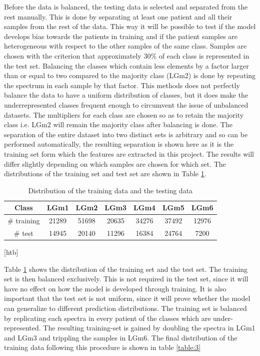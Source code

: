 Before the data is balanced, the testing data is selected and separated from the rest manually. This is done by separating at least one patient and all their samples from the rest of the data. This way it will be possible to test if the model develops bias towards the patients in training and if the patient samples are heterogeneous with respect to the other samples of the same class. Samples are chosen with the criterion that approximately $30\%$ of each class is represented in the test set. Balancing the classes which contain less elements by a factor larger than or equal to two compared to the majority class (LGm2) is done by repeating the spectrum in each sample by that factor. This methods does not perfectly balance the data to have a uniform distribution of classes, but it does make the underrepresented classes frequent enough to circumvent the issue of unbalanced datasets. The multipliers for each class are chosen so as to retain the majority class i.e. LGm2 will remain the majority class after balancing is done. The separation of the entire dataset into two distinct sets is arbitrary and so can be performed automatically, the resulting separation is shown here as it is the training set form which the features are extracted in this project. The results will differ slightly depending on which samples are chosen for which set. The distributions of the training set and test set are shown in Table \ref{table:2}.

\begin{table}[htb]
\centering
 \begin{tabular}{||c c c c c c c||} 
 \hline
 Class & LGm1 & LGm2 & LGm3 & LGm4 & LGm5 & LGm6 \\ [0.5ex] 
 \hline\hline
 \# training & 21289	& 51698	& 20635	& 34276	& 37492	& 12976 \\
 \hline 
 \# test & 14945 & 20140 & 11296 & 16384 & 24764 & 7200 \\
 \hline

\end{tabular}[htb]
\caption{Distribution of the training data and the testing data}
\label{table:2}
\end{table}

Table \ref{table:2} shows the distribution of the training set and the test set. The training set is then balanced exclusively. This is not required in the test set, since it will have no effect on how the model is developed through training. It is also important that the test set is not uniform, since it will prove whether the model can generalize to different prediction distributions. The training set is balanced by replicating each spectra in every patient of the classes which are under-represented. The resulting training-set is gained by doubling the spectra in LGm1 and LGm3 and trippling the samples in LGm6. The final distribution of the training data following this procedure is shown in table \ref{table:3}

